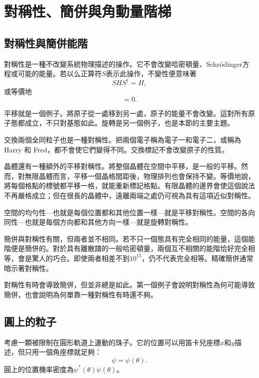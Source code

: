 \chapter{對稱性、簡併與角動量階梯}
\providecommand{\ket}[1]{\left\lvert#1\right\rangle}

\section{對稱性與簡併能階}

對稱性是一種不改變系統物理描述的操作。它不會改變哈密頓量、Schr\"odinger方程或可能的能量。若以么正算符\(S\)表示此操作，不變性便意味著
\begin{equation}
S H S^\dagger=H,
\end{equation}
或等價地
\begin{equation}
[S,H]=0.
\end{equation}

平移就是一個例子。將原子從一處移到另一處，原子的能量不會改變。這對所有原子態都成立，不只對基態如此。旋轉是另一個例子，也是本節的主要主題。

交換兩個全同粒子也是一種對稱性。把兩個電子稱為電子一和電子二，或稱為 Harry 和 Fred，都不會使它們變得不同。交換標記不會改變原子的性質。

晶體還有一種額外的平移對稱性。將整個晶體在空間中平移，是一般的平移。然而，對無限晶體而言，平移一個晶格間距後，物理排列也會保持不變。等價地說，將每個格點的標號都平移一格，就能重新標記格點。有限晶體的邊界會使這個說法不再嚴格成立；但在很長的晶體中，遠離兩端之處仍可視為具有這項近似對稱性。

空間的均勻性---也就是每個位置都和其他位置一樣---就是平移對稱性。空間的各向同性---也就是每個方向都和其他方向一樣---就是旋轉對稱性。

簡併與對稱性有關，但兩者並不相同。若不只一個態具有完全相同的能量，這個能階便是簡併的。對於具有離散譜的一般哈密頓量，兩個互不相關的能階恰好完全相等，會是驚人的巧合。即使兩者相差不到\(10^{15}\)，仍不代表完全相等。精確簡併通常暗示著對稱性。

對稱性有時會導致簡併，但並非總是如此。第一個例子會說明對稱性為何可能導致簡併，也會說明為何單靠一種對稱性有時還不夠。

\section{圓上的粒子}

考慮一顆被限制在圓形軌道上運動的珠子。它的位置可以用笛卡兒座標\(x\)和\(y\)描述，但只用一個角座標就足夠：
\begin{equation}
\psi=\psi(\theta).
\end{equation}
圓上的位置機率密度為\(\psi^*(\theta)\psi(\theta)\)。

